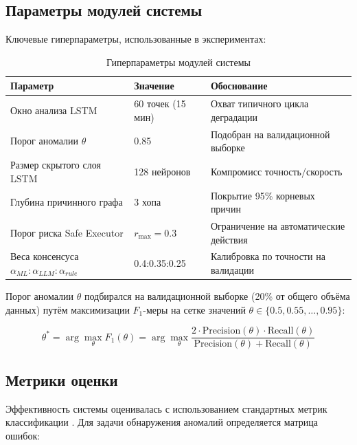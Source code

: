 \subsection{Параметры модулей системы}

Ключевые гиперпараметры, использованные в экспериментах:

\begin{table}[H]
\centering
\caption{Гиперпараметры модулей системы}
\label{tab:hyperparameters}
\begin{tabular}{|p{4cm}|l|p{5cm}|}
\hline
\textbf{Параметр} & \textbf{Значение} & \textbf{Обоснование} \\
\hline
Окно анализа LSTM & 60 точек (15 мин) & Охват типичного цикла деградации \\
\hline
Порог аномалии $\theta$ & 0.85 & Подобран на валидационной выборке \\
\hline
Размер скрытого слоя LSTM & 128 нейронов & Компромисс точность/скорость \\
\hline
Глубина причинного графа & 3 хопа & Покрытие 95\% корневых причин \\
\hline
Порог риска Safe Executor & $r_{\max} = 0.3$ & Ограничение на автоматические действия \\
\hline
Веса консенсуса $\alpha_{ML}:\alpha_{LLM}:\alpha_{rule}$ & 0.4:0.35:0.25 & Калибровка по точности на валидации \\
\hline
\end{tabular}
\end{table}

Порог аномалии $\theta$ подбирался на валидационной выборке (20\% от общего объёма данных) путём максимизации $F_1$-меры на сетке значений $\theta \in \{0.5, 0.55, \ldots, 0.95\}$:

\begin{equation}
\theta^* = \arg\max_{\theta} F_1(\theta) = \arg\max_{\theta} \frac{2 \cdot \text{Precision}(\theta) \cdot \text{Recall}(\theta)}{\text{Precision}(\theta) + \text{Recall}(\theta)}
\label{eq:threshold_selection}
\end{equation}

\subsection{Метрики оценки}

Эффективность системы оценивалась с использованием стандартных метрик классификации \cite{hastie_elements,bishop_pattern_recognition}. Для задачи обнаружения аномалий определяется матрица ошибок:

